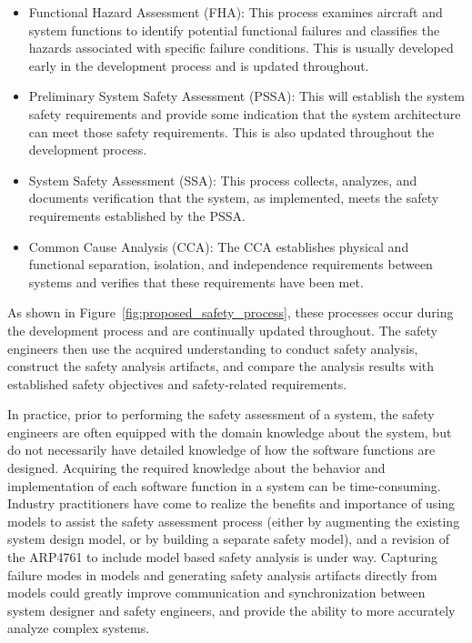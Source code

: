 \begin{itemize}
\item Functional Hazard Assessment (FHA): This process examines aircraft and system functions to identify potential functional failures and classifies the hazards associated with specific failure conditions. This is usually developed early in the development process and is updated throughout. 

\item Preliminary System Safety Assessment (PSSA): This will establish the system safety requirements and provide some indication that the system architecture can meet those safety requirements. This is also updated throughout the development process.

\item System Safety Assessment (SSA): This process collects, analyzes, and documents verification that the system, as implemented, meets the safety requirements established by the PSSA. 

\item Common Cause Analysis (CCA): The CCA establishes physical and functional separation, isolation, and independence requirements between systems and verifies that these requirements have been met.
\end{itemize}

As shown in Figure~\ref{fig:proposed_safety_process}, these processes occur during the development process and are continually updated throughout. The safety engineers then use the acquired understanding to conduct safety analysis, construct the safety analysis artifacts, and compare the analysis results with established safety objectives and safety-related requirements. 

In practice, prior to performing the safety assessment of a system, the safety engineers are often equipped with the domain knowledge about the system, but do not necessarily have detailed knowledge of how the software functions are designed. Acquiring the required knowledge about the behavior and implementation of each software function in a system can be time-consuming. Industry practitioners have come to realize the benefits and importance of using models to assist the safety assessment process (either by augmenting the existing system design model, or by building a separate safety model), and a revision of the ARP4761 to include model based safety analysis is under way. Capturing failure modes in models and generating safety analysis artifacts directly from models could greatly improve communication and synchronization between system designer and safety engineers, and provide the ability to more accurately analyze complex systems. 


